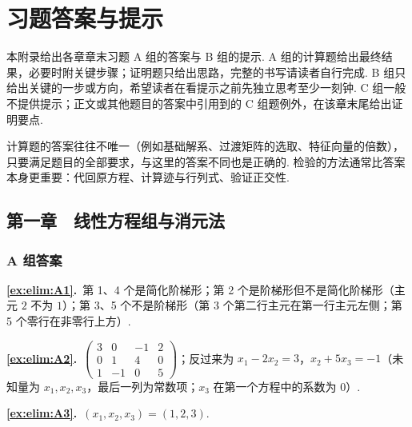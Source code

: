 
\providecommand{\ans}[2]{\par\smallskip\noindent\textbf{\ref{#1}.}\ #2\par}
\setlength{\emergencystretch}{3em}
\chapter{习题答案与提示}\label{app:answers}

本附录给出各章章末习题 A 组的答案与 B 组的提示. A 组的计算题给出最终结果，必要时附关键步骤；证明题只给出思路，完整的书写请读者自行完成. B 组只给出关键的一步或方向，希望读者在看提示之前先独立思考至少一刻钟. C 组一般不提供提示；正文或其他题目的答案中引用到的 C 组题例外，在该章末尾给出证明要点.

计算题的答案往往不唯一（例如基础解系、过渡矩阵的选取、特征向量的倍数），只要满足题目的全部要求，与这里的答案不同也是正确的. 检验的方法通常比答案本身更重要：代回原方程、计算迹与行列式、验证正交性.


\section{第一章　线性方程组与消元法}

\subsection*{A 组答案}

\ans{ex:elim:A1}{第 1、4 个是简化阶梯形；第 2 个是阶梯形但不是简化阶梯形（主元 $2$ 不为 $1$）；第 3、5 个不是阶梯形（第 3 个第二行主元在第一行主元左侧；第 5 个零行在非零行上方）.}

\ans{ex:elim:A2}{$\begin{pmatrix}3&0&-1&2\\0&1&4&0\\1&-1&0&5\end{pmatrix}$；反过来为 $x_1-2x_2=3$，$x_2+5x_3=-1$（未知量为 $x_1,x_2,x_3$，最后一列为常数项；$x_3$ 在第一个方程中的系数为 $0$）.}

\ans{ex:elim:A3}{$(x_1,x_2,x_3)=(1,2,3)$.}

